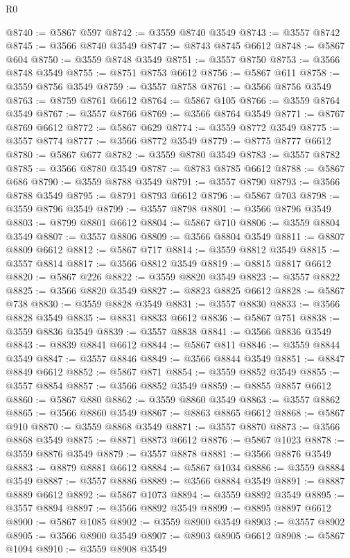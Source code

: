 \begin{lexlean}{R0}
\begin{coremodule}
@8740 := @5867 @597
@8742 := @3559 @8740 @3549
@8743 := @3557 @8742
@8745 := @3566 @8740 @3549
@8747 := @8743 @8745 @6612
@8748 := @5867 @604
@8750 := @3559 @8748 @3549
@8751 := @3557 @8750
@8753 := @3566 @8748 @3549
@8755 := @8751 @8753 @6612
@8756 := @5867 @611
@8758 := @3559 @8756 @3549
@8759 := @3557 @8758
@8761 := @3566 @8756 @3549
@8763 := @8759 @8761 @6612
@8764 := @5867 @105
@8766 := @3559 @8764 @3549
@8767 := @3557 @8766
@8769 := @3566 @8764 @3549
@8771 := @8767 @8769 @6612
@8772 := @5867 @629
@8774 := @3559 @8772 @3549
@8775 := @3557 @8774
@8777 := @3566 @8772 @3549
@8779 := @8775 @8777 @6612
@8780 := @5867 @677
@8782 := @3559 @8780 @3549
@8783 := @3557 @8782
@8785 := @3566 @8780 @3549
@8787 := @8783 @8785 @6612
@8788 := @5867 @686
@8790 := @3559 @8788 @3549
@8791 := @3557 @8790
@8793 := @3566 @8788 @3549
@8795 := @8791 @8793 @6612
@8796 := @5867 @703
@8798 := @3559 @8796 @3549
@8799 := @3557 @8798
@8801 := @3566 @8796 @3549
@8803 := @8799 @8801 @6612
@8804 := @5867 @710
@8806 := @3559 @8804 @3549
@8807 := @3557 @8806
@8809 := @3566 @8804 @3549
@8811 := @8807 @8809 @6612
@8812 := @5867 @717
@8814 := @3559 @8812 @3549
@8815 := @3557 @8814
@8817 := @3566 @8812 @3549
@8819 := @8815 @8817 @6612
@8820 := @5867 @226
@8822 := @3559 @8820 @3549
@8823 := @3557 @8822
@8825 := @3566 @8820 @3549
@8827 := @8823 @8825 @6612
@8828 := @5867 @738
@8830 := @3559 @8828 @3549
@8831 := @3557 @8830
@8833 := @3566 @8828 @3549
@8835 := @8831 @8833 @6612
@8836 := @5867 @751
@8838 := @3559 @8836 @3549
@8839 := @3557 @8838
@8841 := @3566 @8836 @3549
@8843 := @8839 @8841 @6612
@8844 := @5867 @811
@8846 := @3559 @8844 @3549
@8847 := @3557 @8846
@8849 := @3566 @8844 @3549
@8851 := @8847 @8849 @6612
@8852 := @5867 @871
@8854 := @3559 @8852 @3549
@8855 := @3557 @8854
@8857 := @3566 @8852 @3549
@8859 := @8855 @8857 @6612
@8860 := @5867 @880
@8862 := @3559 @8860 @3549
@8863 := @3557 @8862
@8865 := @3566 @8860 @3549
@8867 := @8863 @8865 @6612
@8868 := @5867 @910
@8870 := @3559 @8868 @3549
@8871 := @3557 @8870
@8873 := @3566 @8868 @3549
@8875 := @8871 @8873 @6612
@8876 := @5867 @1023
@8878 := @3559 @8876 @3549
@8879 := @3557 @8878
@8881 := @3566 @8876 @3549
@8883 := @8879 @8881 @6612
@8884 := @5867 @1034
@8886 := @3559 @8884 @3549
@8887 := @3557 @8886
@8889 := @3566 @8884 @3549
@8891 := @8887 @8889 @6612
@8892 := @5867 @1073
@8894 := @3559 @8892 @3549
@8895 := @3557 @8894
@8897 := @3566 @8892 @3549
@8899 := @8895 @8897 @6612
@8900 := @5867 @1085
@8902 := @3559 @8900 @3549
@8903 := @3557 @8902
@8905 := @3566 @8900 @3549
@8907 := @8903 @8905 @6612
@8908 := @5867 @1094
@8910 := @3559 @8908 @3549

\end{coremodule}
\end{lexlean}

